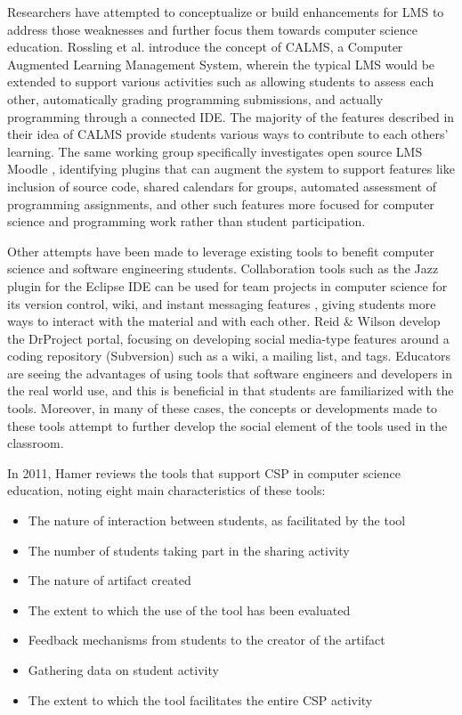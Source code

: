 \begin{itemize}
Researchers have attempted to conceptualize or build enhancements for LMS to address those weaknesses and further focus them towards computer science education. Rossling et al. \cite{rossling2008enhancing} introduce the concept of CALMS, a Computer Augmented Learning Management System, wherein the typical LMS would be extended to support various activities such as allowing students to assess each other, automatically grading programming submissions, and actually programming through a connected IDE. The majority of the features described in their idea of CALMS provide students various ways to contribute to each others' learning. The same working group specifically investigates open source LMS Moodle \cite{rossling2010adapting}, identifying plugins that can augment the system to support features like inclusion of source code, shared calendars for groups, automated assessment of programming assignments, and other such features more focused for computer science and programming work rather than student participation.

Other attempts have been made to leverage existing tools to benefit computer science and software engineering students. Collaboration tools such as the Jazz plugin for the Eclipse IDE can be used for team projects in computer science for its version control, wiki, and instant messaging features \cite{meneely2009preparing}, giving students more ways to interact with the material and with each other. Reid \& Wilson \cite{reid2007drproject} develop the DrProject portal, focusing on developing social media-type features around a coding repository (Subversion) such as a wiki, a mailing list, and tags. Educators are seeing the advantages of using tools that software engineers and developers in the real world use, and this is beneficial in that students are familiarized with the tools. Moreover, in many of these cases, the concepts or developments made to these tools attempt to further develop the social element of the tools used in the classroom.

In 2011, Hamer \cite{hamer2011tools} reviews the tools that support CSP in computer science education, noting eight main characteristics of these tools:
\begin{itemize}
\item The nature of interaction between students, as facilitated by the tool
\item The number of students taking part in the sharing activity
\item The nature of artifact created
\item The extent to which the use of the tool has been evaluated
\item Feedback mechanisms from students to the creator of the artifact
\item Gathering data on student activity
\item The extent to which the tool facilitates the entire CSP activity


\end{itemize}
\end{itemize}
